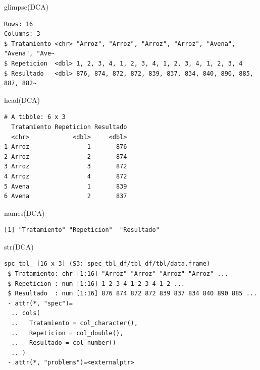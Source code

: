 \documentclass[
  spanish,
  letterpaper,
  DIV=11,
  numbers=noendperiod]{scrreprt}
\newenvironment{Shaded}{\begin{snugshade}}{\end{snugshade}}
\newcommand{\FunctionTok}[1]{\textcolor[rgb]{0.28,0.35,0.67}{#1}}
\newcommand{\NormalTok}[1]{\textcolor[rgb]{0.00,0.23,0.31}{#1}}
\begin{document}
\begin{Shaded}
\begin{Highlighting}[]
\FunctionTok{glimpse}\NormalTok{(DCA)}
\end{Highlighting}
\end{Shaded}

\begin{verbatim}
Rows: 16
Columns: 3
$ Tratamiento <chr> "Arroz", "Arroz", "Arroz", "Arroz", "Avena", "Avena", "Ave~
$ Repeticion  <dbl> 1, 2, 3, 4, 1, 2, 3, 4, 1, 2, 3, 4, 1, 2, 3, 4
$ Resultado   <dbl> 876, 874, 872, 872, 839, 837, 834, 840, 890, 885, 887, 882~
\end{verbatim}

\begin{Shaded}
\begin{Highlighting}[]
\FunctionTok{head}\NormalTok{(DCA)}
\end{Highlighting}
\end{Shaded}

\begin{verbatim}
# A tibble: 6 x 3
  Tratamiento Repeticion Resultado
  <chr>            <dbl>     <dbl>
1 Arroz                1       876
2 Arroz                2       874
3 Arroz                3       872
4 Arroz                4       872
5 Avena                1       839
6 Avena                2       837
\end{verbatim}

\begin{Shaded}
\begin{Highlighting}[]
\FunctionTok{names}\NormalTok{(DCA)}
\end{Highlighting}
\end{Shaded}

\begin{verbatim}
[1] "Tratamiento" "Repeticion"  "Resultado"  
\end{verbatim}

\begin{Shaded}
\begin{Highlighting}[]
\FunctionTok{str}\NormalTok{(DCA)}
\end{Highlighting}
\end{Shaded}

\begin{verbatim}
spc_tbl_ [16 x 3] (S3: spec_tbl_df/tbl_df/tbl/data.frame)
 $ Tratamiento: chr [1:16] "Arroz" "Arroz" "Arroz" "Arroz" ...
 $ Repeticion : num [1:16] 1 2 3 4 1 2 3 4 1 2 ...
 $ Resultado  : num [1:16] 876 874 872 872 839 837 834 840 890 885 ...
 - attr(*, "spec")=
  .. cols(
  ..   Tratamiento = col_character(),
  ..   Repeticion = col_double(),
  ..   Resultado = col_number()
  .. )
 - attr(*, "problems")=<externalptr> 
\end{verbatim}
\end{document}
